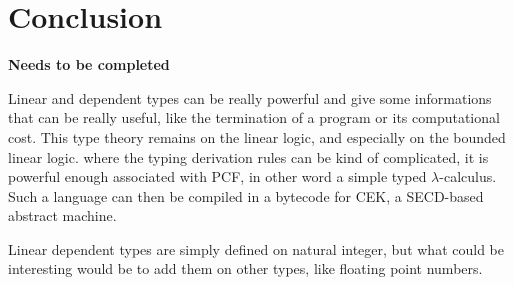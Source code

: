 \documentclass[a4paper,12pt]{article}
\begin{document}
\section{Conclusion}

\textbf{Needs to be completed}

\medskip

Linear and dependent types can be really powerful and give some informations
that can be really useful, like the termination of a program or its
computational cost. This type theory remains on the linear logic, and especially
on the bounded linear logic. where the typing derivation rules can be kind of
complicated, it is powerful enough associated with PCF, in other word a simple
typed $\lambda$-calculus. Such a language can then be compiled in a bytecode for
CEK, a SECD-based abstract machine. 

Linear dependent types are simply defined on natural integer, but what could be
interesting would be to add them on other types, like floating point numbers.




\end{document}
